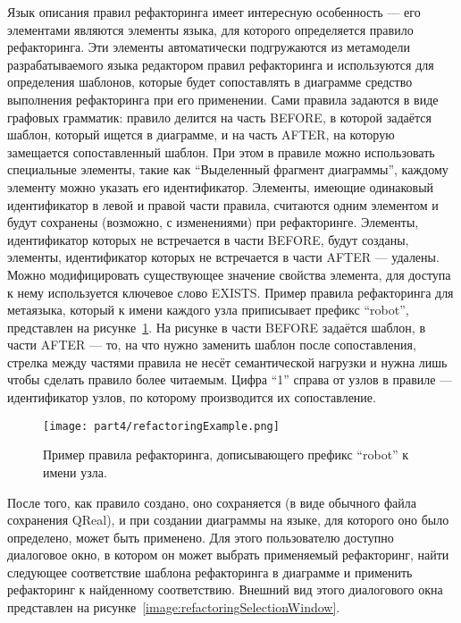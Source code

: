 Язык описания правил рефакторинга имеет интересную особенность --- его элементами 
являются элементы языка, для которого определяется правило рефакторинга. Эти элементы 
автоматически подгружаются из метамодели разрабатываемого языка редактором правил 
рефакторинга и используются для определения шаблонов, которые будет сопоставлять в 
диаграмме средство выполнения рефакторинга при его применении. Сами правила задаются 
в виде графовых грамматик: правило делится на часть BEFORE, в которой задаётся шаблон, 
который ищется в диаграмме, и на часть AFTER, на которую замещается сопоставленный 
шаблон. При этом в правиле можно использовать специальные элементы, такие как "`Выделенный 
фрагмент диаграммы"', каждому элементу можно указать его идентификатор. Элементы, 
имеющие одинаковый идентификатор в левой и правой части правила, считаются одним элементом 
и будут сохранены (возможно, с изменениями) при рефакторинге. Элементы, идентификатор 
которых не встречается в части BEFORE, будут созданы, элементы, идентификатор которых 
не встречается в части AFTER --- удалены. Можно модифицировать существующее значение 
свойства элемента, для доступа к нему используется ключевое слово EXISTS. Пример правила 
рефакторинга для метаязыка, который к имени каждого узла приписывает префикс "`robot"', 
представлен на рисунке~\ref{image:refactoringExample}. На рисунке в части BEFORE задаётся шаблон, в части 
AFTER --- то, на что нужно заменить шаблон после сопоставления, стрелка между частями 
правила не несёт семантической нагрузки и нужна лишь чтобы сделать правило более читаемым. 
Цифра "`1"' справа от узлов в правиле --- идентификатор узлов, по которому производится 
их сопоставление.

\begin{figure} [ht]
	\begin{center}
		\texttt{[image: part4/refactoringExample.png]}
		\caption{Пример правила рефакторинга, дописывающего префикс "`robot"' к имени узла.}
		\label{image:refactoringExample}
	\end{center}
\end{figure}

После того, как правило создано, оно сохраняется (в виде обычного файла сохранения QReal), 
и при создании диаграммы на языке, для которого оно было определено, может быть применено. 
Для этого пользователю доступно диалоговое окно, в котором он может выбрать применяемый 
рефакторинг, найти следующее соответствие шаблона рефакторинга в диаграмме и применить 
рефакторинг к найденному соответствию. Внешний вид этого диалогового окна представлен 
на рисунке~\ref{image:refactoringSelectionWindow}.

